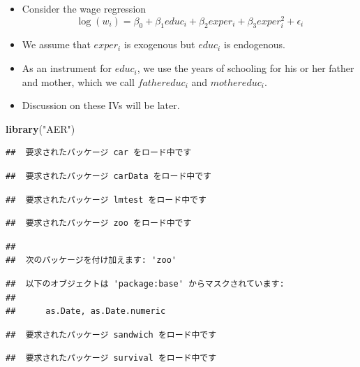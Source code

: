 \documentclass[]{book}
\newenvironment{Shaded}{\begin{snugshade}}{\end{snugshade}}
\newcommand{\KeywordTok}[1]{\textcolor[rgb]{0.13,0.29,0.53}{\textbf{#1}}}
\newcommand{\StringTok}[1]{\textcolor[rgb]{0.31,0.60,0.02}{#1}}
\newcommand{\NormalTok}[1]{#1}
\providecommand{\tightlist}{%
  \setlength{\itemsep}{0pt}\setlength{\parskip}{0pt}}
\begin{document}
\begin{itemize}
\tightlist
\item
  Consider the wage regression \[
  \log(w_i) = \beta_0 + \beta_1 educ_i + \beta_2 exper_i + \beta_3 exper_i^2 + \epsilon_i
  \]
\item
  We assume that \(exper_i\) is exogenous but \(educ_i\) is endogenous.
\item
  As an instrument for \(educ_i\), we use the years of schooling for his
  or her father and mother, which we call \(fathereduc_i\) and
  \(mothereduc_i\).
\item
  Discussion on these IVs will be later.
\end{itemize}

\begin{Shaded}
\begin{Highlighting}[]
\KeywordTok{library}\NormalTok{(}\StringTok{"AER"}\NormalTok{)}
\end{Highlighting}
\end{Shaded}

\begin{verbatim}
##  要求されたパッケージ car をロード中です
\end{verbatim}

\begin{verbatim}
##  要求されたパッケージ carData をロード中です
\end{verbatim}

\begin{verbatim}
##  要求されたパッケージ lmtest をロード中です
\end{verbatim}

\begin{verbatim}
##  要求されたパッケージ zoo をロード中です
\end{verbatim}

\begin{verbatim}
## 
##  次のパッケージを付け加えます: 'zoo'
\end{verbatim}

\begin{verbatim}
##  以下のオブジェクトは 'package:base' からマスクされています: 
## 
##      as.Date, as.Date.numeric
\end{verbatim}

\begin{verbatim}
##  要求されたパッケージ sandwich をロード中です
\end{verbatim}

\begin{verbatim}
##  要求されたパッケージ survival をロード中です
\end{verbatim}
\end{document}
